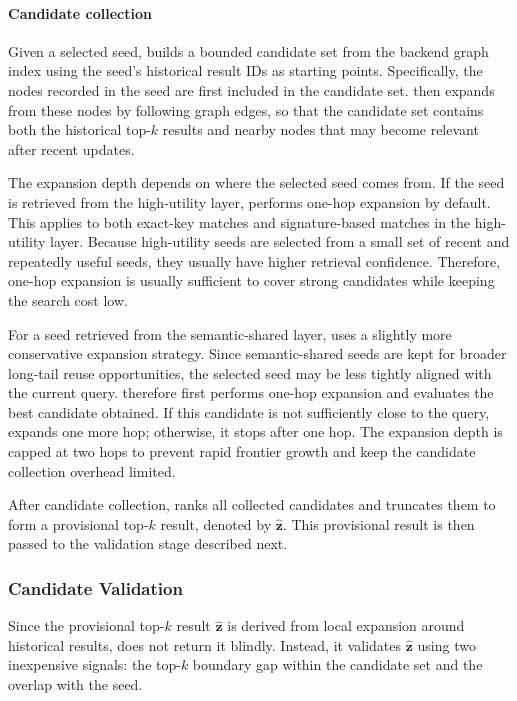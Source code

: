 \paragraph{Candidate collection}
Given a selected seed, \system builds a bounded candidate set from the backend graph index using the seed's historical result IDs as starting points. Specifically, the nodes recorded in the seed are first included in the candidate set. \system then expands from these nodes by following graph edges, so that the candidate set contains both the historical top-$k$ results and nearby nodes that may become relevant after recent updates.

The expansion depth depends on where the selected seed comes from.
If the seed is retrieved from the high-utility layer, \system performs one-hop expansion by default.
This applies to both exact-key matches and signature-based matches in the high-utility layer.
Because high-utility seeds are selected from a small set of recent and repeatedly useful seeds, they usually have higher retrieval confidence.
Therefore, one-hop expansion is usually sufficient to cover strong candidates while keeping the search cost low.

For a seed retrieved from the semantic-shared layer, \system uses a slightly more conservative expansion strategy.
Since semantic-shared seeds are kept for broader long-tail reuse opportunities, the selected seed may be less tightly aligned with the current query.
\system therefore first performs one-hop expansion and evaluates the best candidate obtained.
If this candidate is not sufficiently close to the query, \system expands one more hop; otherwise, it stops after one hop.
The expansion depth is capped at two hops to prevent rapid frontier growth and keep the candidate collection overhead limited.

After candidate collection, \system ranks all collected candidates and truncates them to form a provisional top-$k$ result, denoted by $\hat{\mathbf{z}}$.
This provisional result is then passed to the validation stage described next.





\subsubsection{Candidate Validation}
Since the provisional top-$k$ result $\hat{\mathbf{z}}$ is derived from local expansion around historical results, \system does not return it blindly.
Instead, it validates $\hat{\mathbf{z}}$ using two inexpensive signals: the top-$k$ boundary gap within the candidate set and the overlap with the seed.


